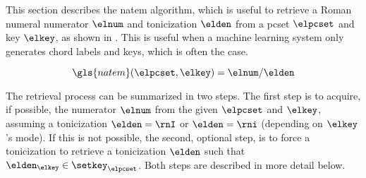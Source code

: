 
This section describes the \gls{natem} algorithm, which is
useful to retrieve a Roman numeral numerator $\elnum$ and
tonicization $\elden$ from a \gls{pcset} $\elpcset$ and key
$\elkey$, as shown in . This is useful when a
machine learning system only generates chord labels and
keys, which is often the case. 

\begin{equation}
    \label{eq:natem}
    \gls{natem}(\elpcset, \elkey) = \elnum\text{/}\elden
\end{equation}

The retrieval process can be summarized in two steps. The
first step is to acquire, if possible, the numerator
$\elnum$ from the given $\elpcset$ and $\elkey$, assuming a
tonicization $\elden = \rnI$ or $\elden = \rni$ (depending
on $\elkey$'s mode). If this is not possible, the second,
optional step, is to force a tonicization to retrieve a
tonicization $\elden$ such that $\elden_\elkey \in
\setkey_\elpcset$. Both steps are described in more detail
below.

